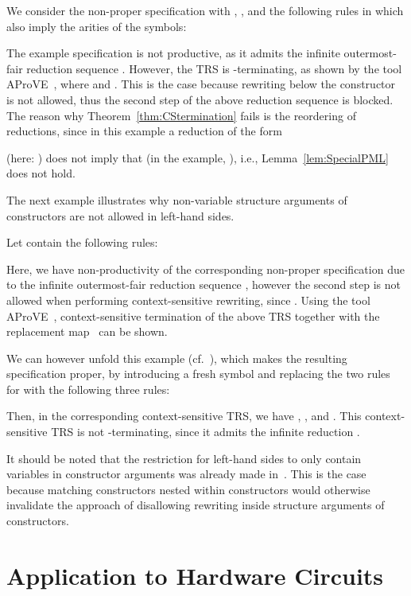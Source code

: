 \documentclass{eptcs}
\begin{document}
\begin{example}
\label{ex:CexpLeftLin}
We consider the non-proper specification
 with ,
,
and the following rules in  which also imply the arities of the symbols:


The example specification is not productive, as it admits the infinite
outermost-fair reduction sequence
.
However, the TRS is -terminating, as shown by the tool
AProVE~\cite{AProVE06}, where  and
. This is the case
because rewriting below the constructor~ is not allowed, thus the
second step of the above reduction sequence is blocked.
The reason why Theorem~\ref{thm:CStermination} fails is the
reordering of reductions, since in this example a reduction of the form

(here: )
does not imply that 
(in the example, ),
i.e., Lemma~\ref{lem:SpecialPML} does not hold.
\end{example}


The next example illustrates why non-variable structure arguments of
constructors are not allowed in left-hand sides.

\begin{example}
\label{ex:CexpConsNonVarArg}
Let  contain the following rules:


Here, we have non-productivity of the corresponding non-proper specification due
to the infinite outermost-fair reduction sequence
,
however the second step is not allowed when performing context-sensitive
rewriting, since .
Using the tool AProVE~\cite{AProVE06}, context-sensitive termination of the
above TRS together with the replacement map~ can be shown.


We can however unfold this example (cf.~\cite{EH11,Z09}),
which makes the resulting specification
proper, by introducing a fresh symbol  and replacing the two
rules for  with the following three rules:


Then, in the corresponding context-sensitive TRS, we have
, , and
.
This context-sensitive TRS is not -terminating, since it admits the
infinite reduction
.
\end{example}

It should be noted that the restriction for left-hand sides to only contain
variables in constructor arguments was already made in~\cite{ZR10}. This is the
case because matching constructors nested within constructors would otherwise
invalidate the approach of disallowing rewriting inside structure arguments of
constructors.



\section{Application to Hardware Circuits}
\label{sec:ApplHW}
\end{document}
